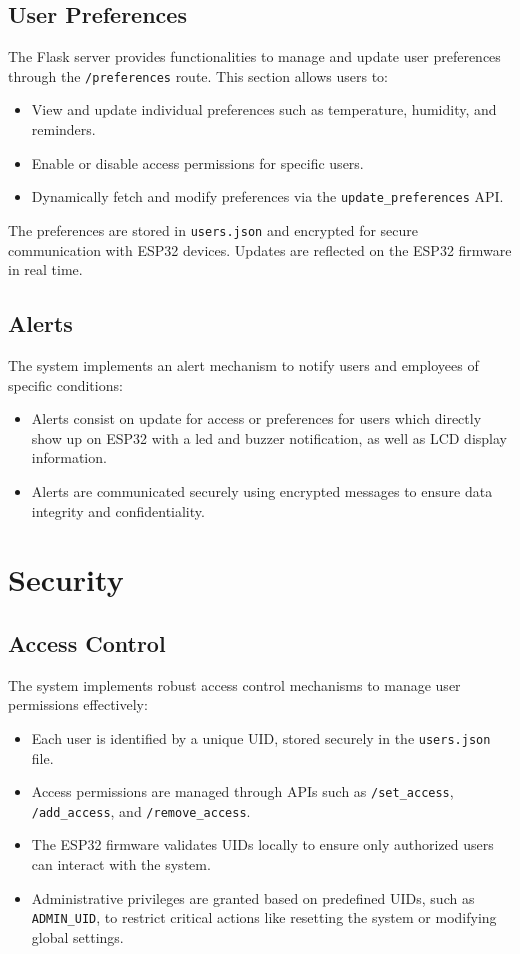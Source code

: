 \documentclass[a4paper,12pt]{report}
\begin{document}
\section{User Preferences}

The Flask server provides functionalities to manage and update user preferences through the \texttt{/preferences} route. This section allows users to:
\begin{itemize}
    \item View and update individual preferences such as temperature, humidity, and reminders.
    \item Enable or disable access permissions for specific users.
    \item Dynamically fetch and modify preferences via the \texttt{update\_preferences} API.
\end{itemize}

The preferences are stored in \texttt{users.json} and encrypted for secure communication with ESP32 devices. Updates are reflected on the ESP32 firmware in real time.

\section{Alerts}

The system implements an alert mechanism to notify users and employees of specific conditions:
\begin{itemize}
    \item Alerts consist on update for access or preferences for users which directly show up on ESP32 with a led and buzzer notification, as well as LCD display information.
    \item Alerts are communicated securely using encrypted messages to ensure data integrity and confidentiality.
\end{itemize}

\chapter{Security}

\section{Access Control}

The system implements robust access control mechanisms to manage user permissions effectively:
\begin{itemize}
    \item Each user is identified by a unique UID, stored securely in the \texttt{users.json} file.
    \item Access permissions are managed through APIs such as \texttt{/set\_access}, \texttt{/add\_access}, and \texttt{/remove\_access}.
    \item The ESP32 firmware validates UIDs locally to ensure only authorized users can interact with the system.
    \item Administrative privileges are granted based on predefined UIDs, such as \texttt{ADMIN\_UID}, to restrict critical actions like resetting the system or modifying global settings.
\end{itemize}
\end{document}
